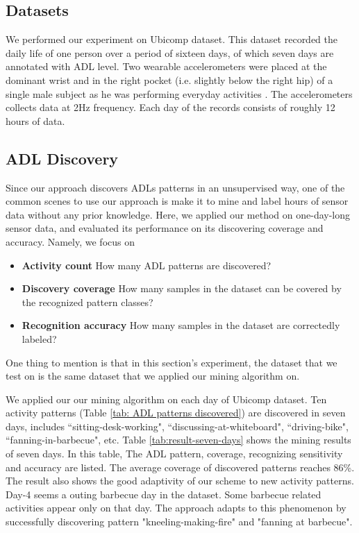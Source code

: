 \documentclass{sigchi}
\begin{document}
    \subsection{Datasets}
    We performed our experiment on Ubicomp dataset.
    This dataset recorded the daily life of one person over a period of sixteen days, of which seven days are annotated with ADL level.
    Two wearable accelerometers were placed at the dominant wrist and in the right pocket (i.e. slightly below the right hip) of a single male subject as he was performing everyday activities \cite{huynh2008discovery}.
    The accelerometers collects data at 2Hz frequency.
    Each day of the records consists of roughly 12 hours of data.

    \subsection{ADL Discovery}
    \label{subsec.exp.mining-on-same-day}

    Since our approach discovers ADLs patterns in an unsupervised way, one of the common scenes to use our approach is make it to mine and label hours of sensor data without any prior knowledge.
    Here, we applied our method on one-day-long sensor data, and evaluated its performance on its discovering coverage and accuracy.
    Namely, we focus on
        \begin{itemize}
        \item \textbf{Activity count} How many ADL patterns are discovered?
        \item \textbf{Discovery coverage} How many samples in the dataset can be covered by the recognized pattern classes?
        \item \textbf{Recognition accuracy} How many samples in the dataset are correctedly labeled?
        \end{itemize}
    One thing to mention is that in this section's experiment, the dataset that we test on is the same dataset that we applied our mining algorithm on.

     We applied our our mining algorithm on each day of Ubicomp dataset.
     Ten activity patterns (Table \ref{tab: ADL patterns discovered}) are discovered in seven days, includes ``sitting-desk-working", ``discussing-at-whiteboard", ``driving-bike", ``fanning-in-barbecue", etc.
     Table \ref{tab:result-seven-days} shows the mining results of seven days.
     In this table, The ADL pattern, coverage, recognizing sensitivity and accuracy are listed.
     The average coverage of discovered patterns reaches 86\%.
     The result also shows the good adaptivity of our scheme to new activity patterns.
     Day-4 seems a outing barbecue day in the dataset. Some barbecue related activities appear only on that day.
     The approach adapts to this phenomenon by successfully discovering pattern "kneeling-making-fire" and "fanning at barbecue".
\end{document}
